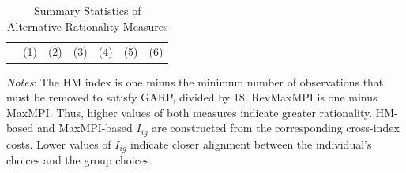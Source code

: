 \documentclass[11 pt]{article}
\begin{document}
\begin{table}[H]
\centering
\caption{Summary Statistics of Alternative Rationality Measures}
\label{tab:alternative_indices_summary}
\begin{tabular}{lrrrrrr}
\toprule
& (1) & (2) & (3) & (4) & (5) & (6) \\

\end{tabular}
\begin{minipage}{\textwidth}
{\footnotesize \emph{Notes}: The HM index is one minus the minimum number of observations that must be removed to satisfy GARP, divided by 18. RevMaxMPI is one minus MaxMPI. Thus, higher values of both measures indicate greater rationality. HM-based and MaxMPI-based $I_{ig}$ are constructed from the corresponding cross-index costs. Lower values of $I_{ig}$ indicate closer alignment between the individual's choices and the group choices.}
\end{minipage}
\end{table}
\end{document}
